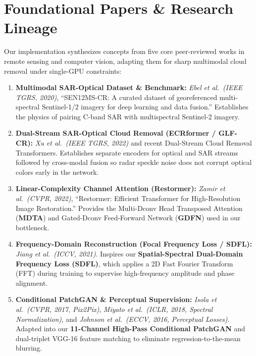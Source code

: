 \documentclass[11pt,a4paper]{article}
\begin{document}
\section{Foundational Papers \& Research Lineage}

Our implementation synthesizes concepts from five core peer-reviewed works in remote sensing and computer vision, adapting them for sharp multimodal cloud removal under single-GPU constraints:

\begin{enumerate}[leftmargin=1.6em, itemsep=4pt]
    \item \textbf{Multimodal SAR-Optical Dataset \& Benchmark:} \textit{Ebel et al.\ (IEEE TGRS, 2020)}, ``SEN12MS-CR: A curated dataset of georeferenced multi-spectral Sentinel-1/2 imagery for deep learning and data fusion.'' Establishes the physics of pairing C-band SAR with multispectral Sentinel-2 imagery.
    \item \textbf{Dual-Stream SAR-Optical Cloud Removal (ECRformer / GLF-CR):} \textit{Xu et al.\ (IEEE TGRS, 2022)} and recent Dual-Stream Cloud Removal Transformers. Establishes separate encoders for optical and SAR streams followed by cross-modal fusion so radar speckle noise does not corrupt optical colors early in the network.
    \item \textbf{Linear-Complexity Channel Attention (Restormer):} \textit{Zamir et al.\ (CVPR, 2022)}, ``Restormer: Efficient Transformer for High-Resolution Image Restoration.'' Provides the Multi-Dconv Head Transposed Attention (\textbf{MDTA}) and Gated-Dconv Feed-Forward Network (\textbf{GDFN}) used in our bottleneck.
    \item \textbf{Frequency-Domain Reconstruction (Focal Frequency Loss / SDFL):} \textit{Jiang et al.\ (ICCV, 2021)}. Inspires our \textbf{Spatial-Spectral Dual-Domain Frequency Loss (SDFL)}, which applies a 2D Fast Fourier Transform (FFT) during training to supervise high-frequency amplitude and phase alignment.
    \item \textbf{Conditional PatchGAN \& Perceptual Supervision:} \textit{Isola et al.\ (CVPR, 2017, Pix2Pix)}, \textit{Miyato et al.\ (ICLR, 2018, Spectral Normalization)}, and \textit{Johnson et al.\ (ECCV, 2016, Perceptual Losses)}. Adapted into our \textbf{11-Channel High-Pass Conditional PatchGAN} and dual-triplet VGG-16 feature matching to eliminate regression-to-the-mean blurring.
\end{enumerate}

\newpage
\end{document}
